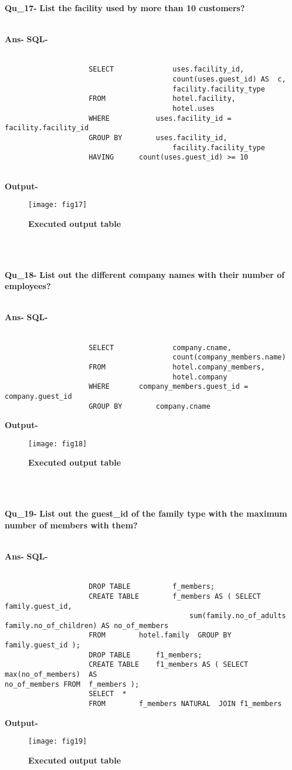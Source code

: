 \documentclass[a4,12pt]{report}
\begin{document}
\newpage
\textbf{Qu\_17-}  \textbf{List the facility used by more than 10 customers?} \\\

\textbf{Ans-}		\textbf{SQL-} \\\
\begin{lstlisting}
					SELECT				uses.facility_id,
										count(uses.guest_id) AS  c,
										facility.facility_type
					FROM				hotel.facility, 
										hotel.uses
					WHERE			uses.facility_id = facility.facility_id
					GROUP BY		uses.facility_id,
										facility.facility_type 
					HAVING		count(uses.guest_id) >= 10
					
\end{lstlisting}
\textbf{Output-} \\			   
\begin{figure}[hbtp]
\centering
\texttt{[image: fig17]}
\caption{\textbf{{\color{red}Executed output table}}}
\end{figure}
\\\

\textbf{Qu\_18-}  \textbf{List out the different company names with their number of employees?} \\\

\textbf{Ans-}		\textbf{SQL-} \\\
\begin{lstlisting}
					SELECT				company.cname,
										count(company_members.name)
					FROM				hotel.company_members,
										hotel.company
					WHERE		company_members.guest_id = company.guest_id 
					GROUP BY		company.cname
\end{lstlisting}						
\textbf{Output-} \\			   
\begin{figure}[hbtp]
\centering
\texttt{[image: fig18]}
\caption{\textbf{{\color{red}Executed output table}}}
\end{figure}
\\\


\textbf{Qu\_19-}  \textbf{List out the guest\_id of the family type with the maximum number of members with them?} \\\

\textbf{Ans-}		\textbf{SQL-} \\\
\begin{lstlisting}
					DROP TABLE 			f_members; 
					CREATE TABLE 		f_members AS ( SELECT	family.guest_id,
											sum(family.no_of_adults family.no_of_children) AS no_of_members
					FROM		hotel.family  GROUP BY	family.guest_id );
					DROP TABLE 		f1_members;
					CREATE TABLE 	f1_members AS ( SELECT	max(no_of_members)  AS 											no_of_members FROM	f_members );
					SELECT	*
					FROM		f_members NATURAL  JOIN	f1_members
\end{lstlisting}	
\textbf{Output-} \\			   
\begin{figure}[hbtp]
\centering
\texttt{[image: fig19]}
\caption{\textbf{{\color{red}Executed output table}}}
\end{figure}
\\\
\end{document}
